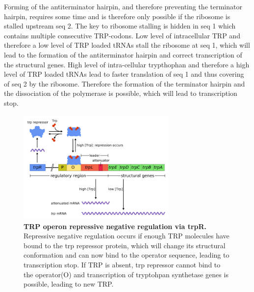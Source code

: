 \documentclass[ twoside,openright,titlepage,numbers=noenddot,headinclude,%
                footinclude=false, cleardoublepage=empty,abstractoff, %
                BCOR=5mm,paper=a4,fontsize=11pt,%
                ngerman,american,%
                ]{scrreprt}
\begin{document}
Forming of the antiterminator hairpin, and therefore preventing the
terminator hairpin, requires some time and is therefore only possible if
the ribosome is stalled upstream seq 2. The key to ribosome stalling is
hidden in seq 1 which contains multiple consecutive TRP-codons. Low level
of intracellular TRP and therefore a low level of TRP loaded tRNAs stall
the ribosome at seq 1, which will lead to the formation of the
antiterminator hairpin and correct transcription of the structural genes. 
High level of intra-cellular trypthophan and therefore a high level of TRP
loaded tRNAs lead to faster translation of seq 1 and thus covering of seq 2 by the ribosome. Therefore the formation of the terminator hairpin and the dissociation of the polymerase is possible, which will lead to transcription stop. 

\begin{figure}
  \begin{center}
\includegraphics[width=0.7\textwidth]{./pictures/Discussion_results/TRP/Trpoperon_trpR.png}
  \end{center}
\caption{{\bf TRP operon repressive negative regulation via trpR.} Repressive negative regulation occurs if enough TRP molecules have bound to the trp repressor protein, which will change its structural conformation and can now bind to the operator sequence, leading to transcription stop. If TRP is absent, trp repressor cannot bind to the operator(O) and transcription of tryptohpan synthetase genes is possible, leading to new TRP.}
\label{fig:trp_operon_trpR}
\end{figure}
\end{document}
